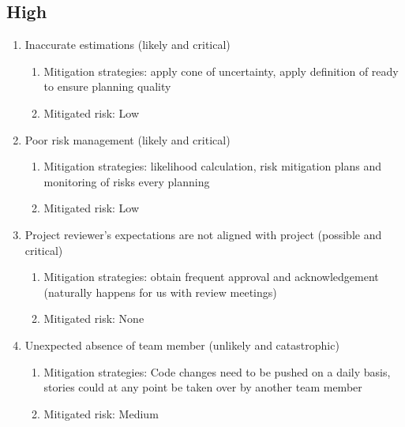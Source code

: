 \subsection{High}
\begin{enumerate}
    \item Inaccurate estimations (likely and critical) 
    \begin{enumerate}
        \item Mitigation strategies: apply cone of uncertainty, apply definition of ready to ensure planning quality
        \item Mitigated risk: Low
    \end{enumerate}

    \item Poor risk management (likely and critical)  
    \begin{enumerate}
        \item Mitigation strategies: likelihood calculation, risk mitigation plans and monitoring of risks every planning
        \item Mitigated risk: Low
    \end{enumerate}

    \item Project reviewer's expectations are not aligned with project (possible and critical) 
    \begin{enumerate}
        \item Mitigation strategies: obtain frequent approval and acknowledgement (naturally happens for us with review meetings)
        \item Mitigated risk: None
    \end{enumerate}

    \item Unexpected absence of team member (unlikely and catastrophic) 
    \begin{enumerate}
        \item Mitigation strategies: Code changes need to be pushed on a daily basis, stories could at any point be taken over by another team member
        \item Mitigated risk: Medium
    \end{enumerate}
\end{enumerate}

